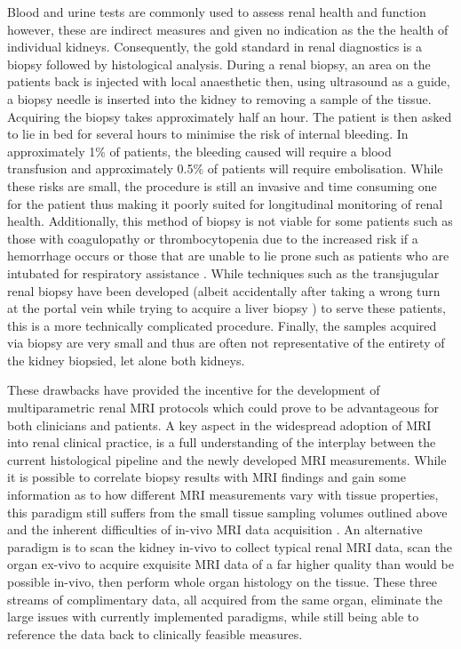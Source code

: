 Blood and urine tests are commonly used to assess renal health and function however, these are indirect measures and given no indication as the the health of individual kidneys. Consequently, the gold standard in renal diagnostics is a biopsy followed by histological analysis. During a renal biopsy, an area on the patients back is injected with local anaesthetic then, using ultrasound as a guide, a biopsy needle is inserted into the kidney to removing a sample of the tissue. Acquiring the biopsy takes approximately half an hour. The patient is then asked to lie in bed for several hours to minimise the risk of internal bleeding. In approximately 1\% of patients, the bleeding caused will require a blood transfusion and approximately 0.5\% of patients will require embolisation. While these risks are small, the procedure is still an invasive and time consuming one for the patient thus making it poorly suited for longitudinal monitoring of renal health. Additionally, this method of biopsy is not viable for some patients such as those with coagulopathy or thrombocytopenia due to the increased risk if a hemorrhage occurs or those that are unable to lie prone such as patients who are intubated for respiratory assistance \cite{rathod_safety_2017}. While techniques such as the transjugular renal biopsy have been developed (albeit accidentally after taking a wrong turn at the portal vein while trying to acquire a liver biopsy \cite{mal_transjugular_1990}) to serve these patients, this is a more technically complicated procedure. Finally, the samples acquired via biopsy are very small and thus are often not representative of the entirety of the kidney biopsied, let alone both kidneys.

These drawbacks have provided the incentive for the development of multiparametric renal \ac{MRI} protocols which could prove to be advantageous for both clinicians and patients. A key aspect in the widespread adoption of \ac{MRI} into renal clinical practice, is a full understanding of the interplay between the current histological pipeline and the newly developed \ac{MRI} measurements. While it is possible to correlate biopsy results with \ac{MRI} findings and gain some information as to how different \ac{MRI} measurements vary with tissue properties, this paradigm still suffers from the small tissue sampling volumes outlined above and the inherent difficulties of in-vivo \ac{MRI} data acquisition \cite{leung_could_2017}. An alternative paradigm is to scan the kidney in-vivo to collect typical renal \ac{MRI} data, scan the organ ex-vivo to acquire exquisite \ac{MRI} data of a far higher quality than would be possible in-vivo, then perform whole organ histology on the tissue. These three streams of complimentary data, all acquired from the same organ, eliminate the large issues with currently implemented paradigms, while still being able to reference the data back to clinically feasible measures.


